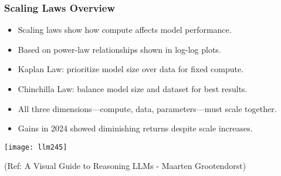 \begin{frame}[fragile]\frametitle{Scaling Laws Overview}

      \begin{itemize}
        \item Scaling laws show how compute affects model performance.
        \item Based on power-law relationships shown in log-log plots.
        \item Kaplan Law: prioritize model size over data for fixed compute.
        \item Chinchilla Law: balance model size and dataset for best results.
        \item All three dimensions—compute, data, parameters—must scale together.
        \item Gains in 2024 showed diminishing returns despite scale increases.
      \end{itemize}

        \begin{center}
        \texttt{[image: llm245]}
		
		{\tiny (Ref: A Visual Guide to Reasoning LLMs - Maarten Grootendorst)}
		
        \end{center}    

\end{frame}


